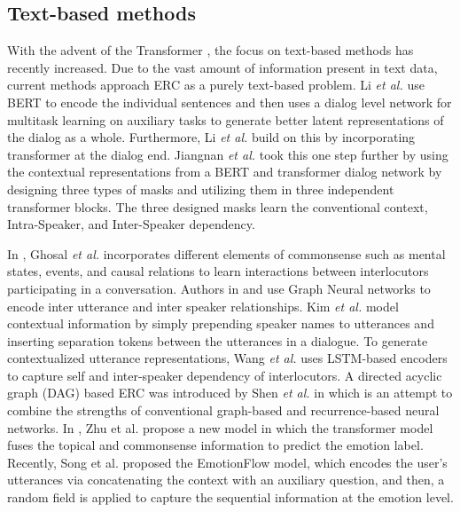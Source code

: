 \documentclass[10pt,twocolumn,letterpaper]{article}
\begin{document}
\subsection{Text-based methods}	
With the advent of the Transformer \cite{transformer}, the focus on text-based methods has recently increased. Due to the vast amount of information present in text data, current methods approach ERC as a purely text-based problem. Li \textit{et al.} \cite{li2020multi} use BERT \cite{devlin2018bert} to encode the individual sentences and then uses a  dialog level network for multitask learning on auxiliary tasks to generate better latent representations of the dialog as a whole. Furthermore, Li \textit{et al.} \cite{li-etal-2020-hitrans} build on this by incorporating transformer at the dialog end. Jiangnan \textit{et al.} \cite{li2020hierarchical} took this one step further by using the contextual representations from a BERT and transformer dialog network by designing three types of masks and utilizing them in three independent transformer blocks. The three designed masks learn the conventional context, Intra-Speaker, and Inter-Speaker dependency.


In \cite{DBLP:journals/corr/abs-2010-02795}, Ghosal \textit{et al.} incorporates different elements of commonsense such as mental states, events, and causal relations to learn interactions between interlocutors participating in a conversation. Authors in \cite{ghosal2019dialoguegcn} and \cite{sheng-etal-2020-summarize} use Graph Neural networks to encode inter utterance and inter speaker relationships. Kim \textit{et al.} \cite{kim2021emoberta} model contextual information by simply prepending speaker names to utterances and inserting separation tokens between the utterances in a dialogue. To generate contextualized utterance representations, Wang \textit{et al.} \cite{wang-etal-2020-contextualized} uses LSTM-based encoders to capture self and inter-speaker dependency of interlocutors. A directed acyclic graph (DAG) based ERC was introduced by Shen \textit{et al.} in \cite{shen2021directed} which is an attempt to combine the strengths of conventional graph-based and recurrence-based neural networks. In \cite{zhu2021topic}, Zhu et al. propose a new model in which the transformer model fuses the topical and commonsense information to predict the emotion label. Recently, Song et al. \cite{emotionflow} proposed the EmotionFlow model, which encodes the user's utterances via concatenating the context with an auxiliary question, and then, a random field is applied to capture the sequential information at the emotion level. 
	
\end{document}
